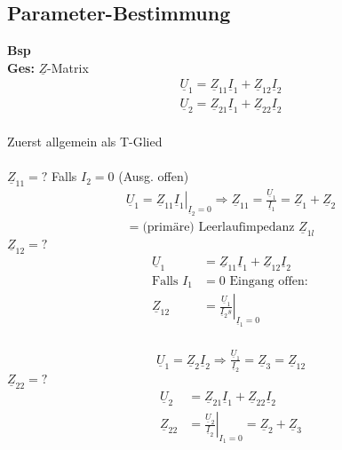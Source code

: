 \subsection{Parameter-Bestimmung}
\textbf{Bsp} \\
\textbf{Ges:} $\underline{Z}$-Matrix\\
\begin{align}
	\underline{U}_1=\underline{Z}_{11}\underline{I}_1+\underline{Z}_{12}\underline{I}_2\nonumber\\
	\underline{U}_2=\underline{Z}_{21}\underline{I}_1+\underline{Z}_{22}\underline{I}_2\nonumber
	\end{align}\\
Zuerst allgemein als T-Glied\\
\\
$\underline{Z}_{11}=?$
Falls $I_2=0$ (Ausg. offen)\\
\begin{align}
	\left. \underline{U}_1=\underline{Z}_{11}\underline{I}_1
	\right|_{\underline{I}_2=0}  \Rightarrow \underline{Z}_{11}=\frac{\underline{U}_1}{\underline{I}_1}=\underline{Z}_1+\underline{Z}_2\nonumber\\
	=\text{(primäre) Leerlaufimpedanz }\underline{Z}_{1l}\nonumber
\end{align}
$\underline{Z}_{12}=?$\\
\begin{align}
	\underline{U}_1&=\underline{Z}_{11}\underline{I}_1+\underline{Z}_{12}\underline{I}_2\nonumber\\
	\text{Falls } I_1&=0 \text{ Eingang offen}:\nonumber\\
	\underline{Z}_{12}&=\left.\frac{\underline{U}_1}{\underline{I}_2s}\right|_{\underline{I}_1=0}\nonumber
\end{align}
\\
\begin{align}
	\underline{U}_1=\underline{Z}_2\underline{I}_2 \Rightarrow
	\frac{\underline{U}_1}{\underline{I}_2}=\underline{Z}_3=\underline{Z}_{12}\nonumber
\end{align}
$\underline{Z}_{22}=?$\\
\begin{align}
	\underline{U}_2&=\underline{Z}_{21}\underline{I}_1+\underline{Z}_{22}\underline{I}_2\nonumber\\
	\underline{Z}_{22}&=\left.\frac{\underline{U}_2}{\underline{I}_2}\right|_{I_1=0}=\underline{Z}_2+\underline{Z}_3\nonumber
\end{align}
